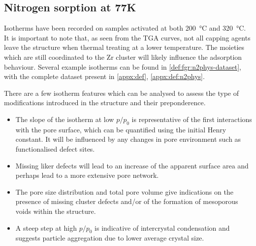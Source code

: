 
\subsection{Nitrogen sorption at 77K}

Isotherms have been recorded on samples activated at both
\SI{200}{\degreeCelsius} and \SI{320}{\degreeCelsius}.
It is important to note that, as seen from the TGA curves,
not all capping agents leave the structure when thermal treating
at a lower temperature. The moieties which are still coordinated
to the Zr cluster will likely influence the adsorption
behaviour. Several example isotherms can be found in
\autoref{def:fgr:n2phys-dataset}, with the complete dataset
present in \autoref{appx:def}, \autoref{appx:def:n2phys}.

There are a few isotherm features which can be analysed to
assess the type of modifications introduced in the structure
and their preponderence.

\begin{itemize}
	\item The slope of the isotherm at low \(p/p_0\) is representative
	      of the first interactions with the pore surface, which can be
	      quantified using the initial Henry constant. It will be influenced
	      by any changes in pore environment such as functionalised defect
	      sites.
	\item Missing liker defects will lead to an increase of the
	      apparent surface area and perhaps lead to a more extensive
	      pore network.
	\item The pore size distribution and total pore volume give
	      indications on the presence of missing cluster defects and/or
	      of the formation of mesoporous voids within the structure.
	\item A steep step at high \(p/p_0\) is indicative of intercrystal
	      condensation and suggests particle aggregation due to lower average
	      crystal size.
\end{itemize}


